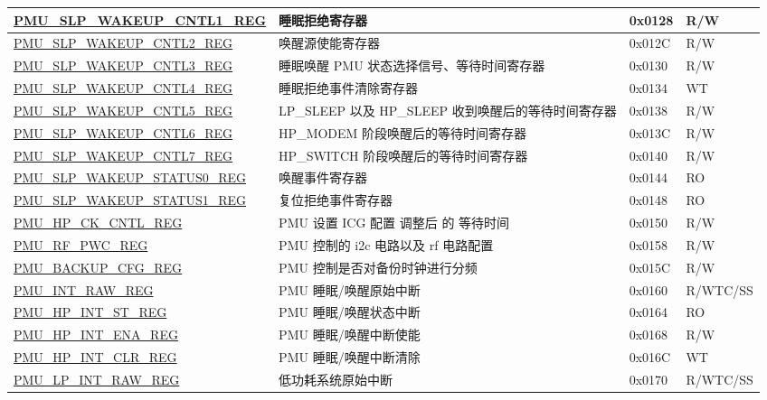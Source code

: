 \begin{longtable}{ | p{6.5cm} | p{8cm} | p{1.3cm} | p{1cm} | }
\hyperref[regdesc:PMUSLPWAKEUPCNTL1REG]{PMU\_SLP\_WAKEUP\_CNTL1\_REG} & 睡眠拒绝寄存器 & 0x0128 & R/W \\ \hline
\hyperref[regdesc:PMUSLPWAKEUPCNTL2REG]{PMU\_SLP\_WAKEUP\_CNTL2\_REG} & 唤醒源使能寄存器 & 0x012C & R/W \\ \hline
\hyperref[regdesc:PMUSLPWAKEUPCNTL3REG]{PMU\_SLP\_WAKEUP\_CNTL3\_REG} & 睡眠唤醒 PMU 状态选择信号、等待时间寄存器 & 0x0130 & R/W \\ \hline
\hyperref[regdesc:PMUSLPWAKEUPCNTL4REG]{PMU\_SLP\_WAKEUP\_CNTL4\_REG} & 睡眠拒绝事件清除寄存器 & 0x0134 & WT \\ \hline
\hyperref[regdesc:PMUSLPWAKEUPCNTL5REG]{PMU\_SLP\_WAKEUP\_CNTL5\_REG} & LP\_SLEEP 以及 HP\_SLEEP 收到唤醒后的等待时间寄存器 & 0x0138 & R/W \\ \hline
\hyperref[regdesc:PMUSLPWAKEUPCNTL6REG]{PMU\_SLP\_WAKEUP\_CNTL6\_REG} & HP\_MODEM 阶段唤醒后的等待时间寄存器 & 0x013C & R/W \\ \hline
\hyperref[regdesc:PMUSLPWAKEUPCNTL7REG]{PMU\_SLP\_WAKEUP\_CNTL7\_REG} & HP\_SWITCH 阶段唤醒后的等待时间寄存器 & 0x0140 & R/W \\ \hline
\hyperref[regdesc:PMUSLPWAKEUPSTATUS0REG]{PMU\_SLP\_WAKEUP\_STATUS0\_REG} & 唤醒事件寄存器 & 0x0144 & RO \\ \hline
\hyperref[regdesc:PMUSLPWAKEUPSTATUS1REG]{PMU\_SLP\_WAKEUP\_STATUS1\_REG} & 复位拒绝事件寄存器 & 0x0148 & RO \\ \hline
\hyperref[regdesc:PMUHPCKCNTLREG]{PMU\_HP\_CK\_CNTL\_REG} & PMU 设置 ICG 配置 调整后 的 等待时间 & 0x0150 & R/W \\ \hline
\hyperref[regdesc:PMURFPWCREG]{PMU\_RF\_PWC\_REG} & PMU 控制的 i2c 电路以及 rf 电路配置 & 0x0158 & R/W \\ \hline
\hyperref[regdesc:PMUBACKUPCFGREG]{PMU\_BACKUP\_CFG\_REG} & PMU 控制是否对备份时钟进行分频 & 0x015C & R/W \\ \hline
\hyperref[regdesc:PMUINTRAWREG]{PMU\_INT\_RAW\_REG} & PMU 睡眠/唤醒原始中断 & 0x0160 & R/\-WTC/\-SS \\ \hline
\hyperref[regdesc:PMUHPINTSTREG]{PMU\_HP\_INT\_ST\_REG} & PMU 睡眠/唤醒状态中断 & 0x0164 & RO \\ \hline
\hyperref[regdesc:PMUHPINTENAREG]{PMU\_HP\_INT\_ENA\_REG} & PMU 睡眠/唤醒中断使能 & 0x0168 & R/W \\ \hline
\hyperref[regdesc:PMUHPINTCLRREG]{PMU\_HP\_INT\_CLR\_REG} & PMU 睡眠/唤醒中断清除 & 0x016C & WT \\ \hline
\hyperref[regdesc:PMULPINTRAWREG]{PMU\_LP\_INT\_RAW\_REG} & 低功耗系统原始中断 & 0x0170 & R/\-WTC/\-SS \\ \hline

\end{longtable}

